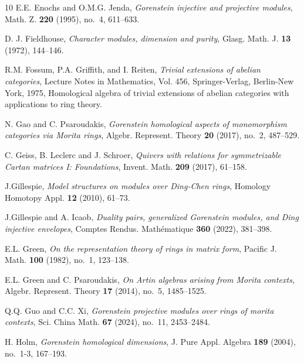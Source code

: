 \documentclass[10pt,twoside]{amsart}
\theoremstyle{bfupright head,slanted body}
\theoremstyle{bfupright head,upright body}
\theoremstyle{fixed bf head,slanted body}
\theoremstyle{fixed bf head,upright body}
\theoremstyle{numbered paragraph}
\numberwithin{equation}{res}
\begin{document}
\begin{thebibliography}{10}
E.E. Enochs and O.M.G. Jenda, \emph{Gorenstein injective and
  projective modules}, Math. Z. \textbf{220} (1995), no.~4, 611--633.


D. J. Fieldhouse, \emph{Character modules, dimension and purity}, Glasg. Math. J. {\bf 13} (1972), 144--146.

R.M. Fossum, P.A. Griffith, and I. Reiten, \emph{Trivial
  extensions of abelian categories}, Lecture Notes in Mathematics, Vol. 456,
  Springer-Verlag, Berlin-New York, 1975, Homological algebra of trivial
  extensions of abelian categories with applications to ring theory.

N. Gao and C. Psaroudakis, \emph{Gorenstein homological aspects of
  monomorphism categories via {M}orita rings}, Algebr. Represent. Theory
  \textbf{20} (2017), no.~2, 487--529. %

C. Geiss, B. Leclerc and J. Schroer, \emph{Quivers with relations for symmetrizable Cartan
matrices I: Foundations}, Invent. Math. \textbf{209} (2017), 61--158.

J.Gillespie, \emph{Model structures on modules over Ding-Chen rings}, Homology Homotopy Appl. {\bf 12} (2010), 61--73.

J.Gillespie and A. Icaob, \emph{Duality pairs, generalized Gorenstein modules, and Ding injective envelopes},
Comptes Rendus. Mathématique {\bf 360} (2022), 381--398.

E.L. Green, \emph{On the representation theory of rings in matrix form},
  Pacific J. Math. \textbf{100} (1982), no.~1, 123--138. %

E.L. Green and C. Psaroudakis, \emph{On {A}rtin algebras arising
  from {M}orita contexts}, Algebr. Represent. Theory \textbf{17} (2014), no.~5,
  1485--1525. %

Q.Q. Guo and C.C. Xi, \emph{Gorenstein projective modules over rings
  of morita contexts}, Sci. China Math. \textbf{67} (2024), no.~11, 2453--2484. %

H. Holm, \emph{Gorenstein homological dimensions}, J. Pure Appl. Algebra
  \textbf{189} (2004), no.~1-3, 167--193. %


\end{thebibliography}
\end{document}
